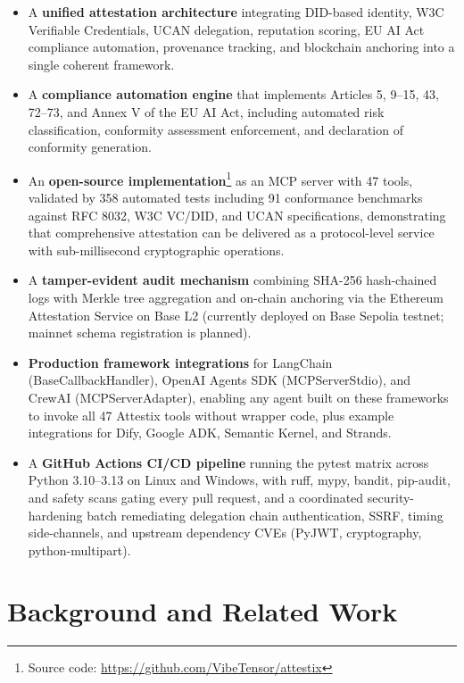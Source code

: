 \documentclass[conference]{IEEEtran}
\begin{document}
\begin{itemize}
    \item A \textbf{unified attestation architecture} integrating DID-based identity, W3C Verifiable Credentials, UCAN delegation, reputation scoring, EU AI Act compliance automation, provenance tracking, and blockchain anchoring into a single coherent framework.
    \item A \textbf{compliance automation engine} that implements Articles 5, 9--15, 43, 72--73, and Annex V of the EU AI Act, including automated risk classification, conformity assessment enforcement, and declaration of conformity generation.
    \item An \textbf{open-source implementation}\footnote{Source code: \url{https://github.com/VibeTensor/attestix}} as an MCP server with 47 tools, validated by 358 automated tests including 91 conformance benchmarks against RFC 8032, W3C VC/DID, and UCAN specifications, demonstrating that comprehensive attestation can be delivered as a protocol-level service with sub-millisecond cryptographic operations.
    \item A \textbf{tamper-evident audit mechanism} combining SHA-256 hash-chained logs with Merkle tree aggregation and on-chain anchoring via the Ethereum Attestation Service on Base L2 (currently deployed on Base Sepolia testnet; mainnet schema registration is planned).
    \item \textbf{Production framework integrations} for LangChain (BaseCallbackHandler), OpenAI Agents SDK (MCPServerStdio), and CrewAI (MCPServerAdapter), enabling any agent built on these frameworks to invoke all 47 Attestix tools without wrapper code, plus example integrations for Dify, Google ADK, Semantic Kernel, and Strands.
    \item A \textbf{GitHub Actions CI/CD pipeline} running the pytest matrix across Python 3.10--3.13 on Linux and Windows, with ruff, mypy, bandit, pip-audit, and safety scans gating every pull request, and a coordinated security-hardening batch remediating delegation chain authentication, SSRF, timing side-channels, and upstream dependency CVEs (PyJWT, cryptography, python-multipart).
\end{itemize}

\section{Background and Related Work}
\label{sec:related}
\end{document}
